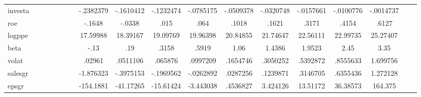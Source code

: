 {\begin{tabular}{l*{1}{ccccccccccccccccc}}
investa     &            &            &            &            &            &            &   -.2382379&   -.1610412&   -.1232474&   -.0785175&   -.0509378&   -.0320748&   -.0157661&   -.0100776&   -.0014737&            &            \\
roe         &            &            &            &            &            &            &      -.1648&      -.0338&        .015&        .064&       .1018&       .1621&       .3171&       .4154&       .6127&            &            \\
logppe      &            &            &            &            &            &            &    17.59988&    18.39167&    19.09769&    19.96398&    20.84855&    21.74647&    22.56111&    22.99735&    25.27407&            &            \\
beta        &            &            &            &            &            &            &        -.13&         .19&       .3158&       .5919&        1.06&      1.4386&      1.9523&        2.45&        3.35&            &            \\
volat       &            &            &            &            &            &            &      .02961&    .0511106&     .065876&    .0997209&    .1654746&    .3050252&    .5392872&    .8555633&    1.699756&            &            \\
salesgr     &            &            &            &            &            &            &   -1.876323&   -.3975153&   -.1969562&   -.0262892&    .0287256&    .1239871&    .3146705&    .6355436&    1.272128&            &            \\
epsgr       &            &            &            &            &            &            &   -154.1881&   -41.17265&   -15.61424&   -3.443038&    .4536827&    3.424126&    13.51172&    36.38573&     164.375&            &            \\
\hline\hline
\end{tabular}
}

